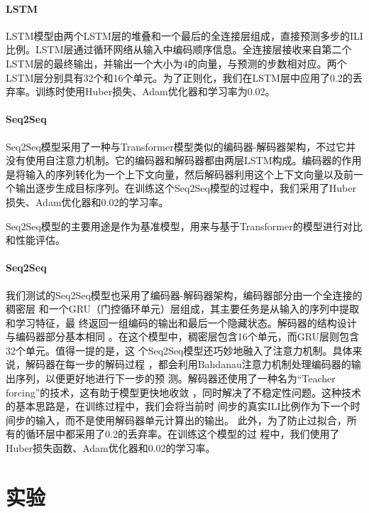 \paragraph*{LSTM}
LSTM模型由两个LSTM层的堆叠和一个最后的全连接层组成，直接预测多步的ILI比例。LSTM层通过循环网络从输入中编码顺序信息。全连接层接收来自第二个LSTM层的最终输出，并输出一个大小为4的向量，与预测的步数相对应。两个LSTM层分别具有32个和16个单元。为了正则化，我们在LSTM层中应用了0.2的丢弃率。训练时使用Huber损失、Adam优化器和学习率为0.02。

\paragraph*{Seq2Seq}
Seq2Seq模型采用了一种与Transformer模型类似的编码器-解码器架构，不过它并没有使用自注意力机制。它的编码器和解码器都由两层LSTM构成。编码器的作用是将输入的序列转化为一个上下文向量，然后解码器利用这个上下文向量以及前一个输出逐步生成目标序列。在训练这个Seq2Seq模型的过程中，我们采用了Huber损失、Adam优化器和0.02的学习率。

Seq2Seq模型的主要用途是作为基准模型，用来与基于Transformer的模型进行对比和性能评估。

\paragraph*{Seq2Seq}
我们测试的Seq2Seq模型也采用了编码器-解码器架构，编码器部分由一个全连接的稠密层
和一个GRU（门控循环单元）层组成，其主要任务是从输入的序列中提取和学习特征，最
终返回一组编码的输出和最后一个隐藏状态。解码器的结构设计与编码器部分基本相同
。在这个模型中，稠密层包含16个单元，而GRU层则包含32个单元。值得一提的是，这
个Seq2Seq模型还巧妙地融入了注意力机制。具体来说，解码器在每一步的解码过程
，都会利用Bahdanau注意力机制处理编码器的输出序列，以便更好地进行下一步的预
测。解码器还使用了一种名为“Teacher forcing”的技术，这有助于模型更快地收敛
，同时解决了不稳定性问题。这种技术的基本思路是，在训练过程中，我们会将当前时
间步的真实ILI比例作为下一个时间步的输入，而不是使用解码器单元计算出的输出。
此外，为了防止过拟合，所有的循环层中都采用了0.2的丢弃率。在训练这个模型的过
程中，我们使用了Huber损失函数、Adam优化器和0.02的学习率。
\section{实验}
